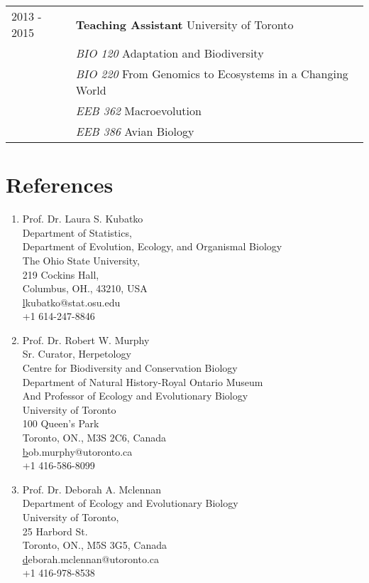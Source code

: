 \documentclass[11pt]{article}
\begin{document}
\begin{longtable}{p{}  p{}}

2013 - 2015 & \textbf{Teaching Assistant} University of Toronto\\
 & \textit{BIO 120} Adaptation and Biodiversity\\
 & \textit{BIO 220} From Genomics to Ecosystems in a Changing World\\
& \textit{EEB 362} Macroevolution\\
& \textit{EEB 386} Avian Biology\\

\end{longtable}




\newpage

\section*{References}

\begin{enumerate}

\item Prof. Dr. Laura S. Kubatko\\Department of Statistics,\\Department of Evolution, Ecology, and Organismal Biology\\The Ohio State University,\\219 Cockins Hall,\\Columbus, OH., 43210, USA\\\href{lkubatko@stat.osu.edu}lkubatko@stat.osu.edu\\+1 614-247-8846\\

\item Prof. Dr. Robert W. Murphy\\Sr. Curator, Herpetology\\Centre for Biodiversity and Conservation Biology\\Department of Natural History-Royal Ontario Museum\\And Professor of Ecology and Evolutionary Biology\\ University of Toronto\\100 Queen’s Park\\Toronto, ON., M3S 2C6, Canada\\\href{bob.murphy@utoronto.ca}bob.murphy@utoronto.ca\\+1 416-586-8099

\item Prof. Dr. Deborah A. Mclennan\\Department of Ecology and Evolutionary Biology\\University of Toronto,\\25 Harbord St.\\Toronto, ON., M5S 3G5, Canada \\\href{deborah.mclennan@utoronto.ca}deborah.mclennan@utoronto.ca\\+1 416-978-8538
\end{enumerate}









\end{document}
